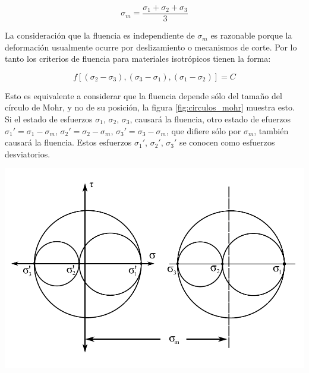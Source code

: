 \begin{equation}
\sigma_m=\frac{\sigma_1+\sigma_2+\sigma_3}{3}
\end{equation}

La consideración que la fluencia es independiente de $\sigma_m$ es razonable porque la deformación 
usualmente ocurre por deslizamiento o mecanismos de corte. Por lo tanto los criterios de fluencia 
para materiales isotrópicos tienen la forma: ~\cite{hosford2007}

\begin{equation}
f[(\sigma_2-\sigma_3 ),(\sigma_3-\sigma_1 ),(\sigma_1-\sigma_2 )] = C
\end{equation}

Esto es equivalente a considerar que la fluencia depende sólo del tamaño del círculo de Mohr, 
y no de su posición, la figura \ref{fig:circulos_mohr} muestra esto. Si el estado de esfuerzos 
$\sigma_1$, $\sigma_2$, $\sigma_3$, causará la fluencia, otro estado de efuerzos 
$\sigma_1' = \sigma_1 - \sigma_m $, $\sigma_2' = \sigma_2 - \sigma_m $, $\sigma_3' = \sigma_3 - \sigma_m $, 
que difiere sólo por $\sigma_m$, también causará la fluencia. Estos esfuerzos $\sigma_1'$, $\sigma_2'$, 
$\sigma_3'$ se conocen como esfuerzos desviatorios. ~\cite{hosford2007}

\begin{center}
\includegraphics[scale=0.75]{src/ch2/circulos_mohr_svg}
\label{fig:circulos_mohr}
\end{center}



